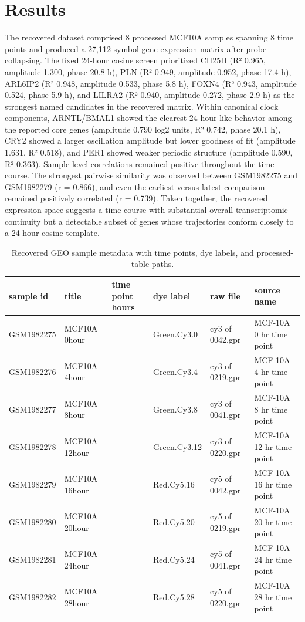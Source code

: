 \documentclass[11pt]{article}
\begin{document}
\section{Results}
The recovered dataset comprised 8 processed MCF10A samples spanning 8 time points and produced a 27,112-symbol gene-expression matrix after probe collapsing. The fixed 24-hour cosine screen prioritized CH25H (R² 0.965, amplitude 1.300, phase 20.8 h), PLN (R² 0.949, amplitude 0.952, phase 17.4 h), ARL6IP2 (R² 0.948, amplitude 0.533, phase 5.8 h), FOXN4 (R² 0.943, amplitude 0.524, phase 5.9 h), and LILRA2 (R² 0.940, amplitude 0.272, phase 2.9 h) as the strongest named candidates in the recovered matrix. Within canonical clock components, ARNTL/BMAL1 showed the clearest 24-hour-like behavior among the reported core genes (amplitude 0.790 log2 units, R² 0.742, phase 20.1 h), CRY2 showed a larger oscillation amplitude but lower goodness of fit (amplitude 1.631, R² 0.518), and PER1 showed weaker periodic structure (amplitude 0.590, R² 0.363). Sample-level correlations remained positive throughout the time course. The strongest pairwise similarity was observed between GSM1982275 and GSM1982279 (r = 0.866), and even the earliest-versus-latest comparison remained positively correlated (r = 0.739). Taken together, the recovered expression space suggests a time course with substantial overall transcriptomic continuity but a detectable subset of genes whose trajectories conform closely to a 24-hour cosine template.

\begin{table}[tbp]
\centering
\small
\caption{Recovered GEO sample metadata with time points, dye labels, and processed-table paths.}
\label{tab:geo-sample-metadata}
\begin{tabularx}{\linewidth}{>{\raggedright\arraybackslash}X>{\raggedright\arraybackslash}X>{\raggedright\arraybackslash}X>{\raggedright\arraybackslash}X>{\raggedright\arraybackslash}X>{\raggedright\arraybackslash}X}
\toprule
sample id & title & time point hours & dye label & raw file & source name \\
\midrule
GSM1982275 & MCF10A 0hour & 0 & Green.Cy3.0 & cy3 of 0042.gpr & MCF-10A 0 hr time point \\
GSM1982276 & MCF10A 4hour & 4 & Green.Cy3.4 & cy3 of 0219.gpr & MCF-10A 4 hr time point \\
GSM1982277 & MCF10A 8hour & 8 & Green.Cy3.8 & cy3 of 0041.gpr & MCF-10A 8 hr time point \\
GSM1982278 & MCF10A 12hour & 12 & Green.Cy3.12 & cy3 of 0220.gpr & MCF-10A 12 hr time point \\
GSM1982279 & MCF10A 16hour & 16 & Red.Cy5.16 & cy5 of 0042.gpr & MCF-10A 16 hr time point \\
GSM1982280 & MCF10A 20hour & 20 & Red.Cy5.20 & cy5 of 0219.gpr & MCF-10A 20 hr time point \\
GSM1982281 & MCF10A 24hour & 24 & Red.Cy5.24 & cy5 of 0041.gpr & MCF-10A 24 hr time point \\
GSM1982282 & MCF10A 28hour & 28 & Red.Cy5.28 & cy5 of 0220.gpr & MCF-10A 28 hr time point \\
\bottomrule
\end{tabularx}
\end{table}
\end{document}
